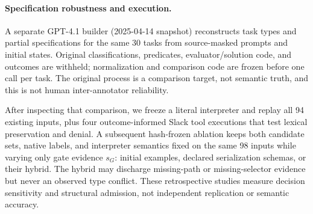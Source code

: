 \paragraph{Specification robustness and execution.} A separate GPT-4.1 builder (2025-04-14 snapshot) reconstructs task types and partial specifications for the same 30 tasks from source-masked prompts and initial states. Original classifications, predicates, evaluator/solution code, and outcomes are withheld; normalization and comparison code are frozen before one call per task. The original process is a comparison target, not semantic truth, and this is not human inter-annotator reliability.

After inspecting that comparison, we freeze a literal interpreter and replay all 94 existing inputs, plus four outcome-informed Slack tool executions that test lexical preservation and denial. A subsequent hash-frozen ablation keeps both candidate sets, native labels, and interpreter semantics fixed on the same 98 inputs while varying only gate evidence $s_G$: initial examples, declared serialization schemas, or their hybrid. The hybrid may discharge missing-path or missing-selector evidence but never an observed type conflict. These retrospective studies measure decision sensitivity and structural admission, not independent replication or semantic accuracy.

